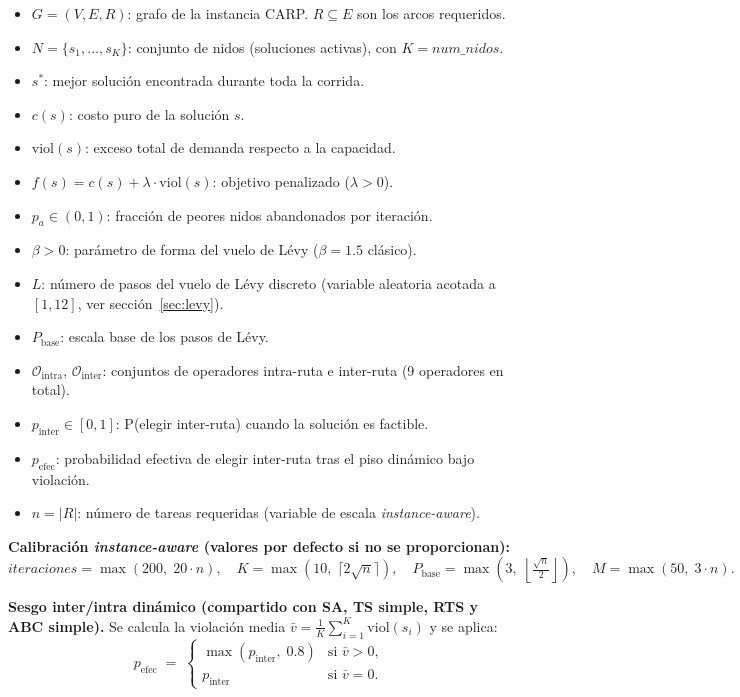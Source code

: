 \documentclass[12pt, a4paper]{article}
\begin{document}
\begin{itemize}
    \item $G = (V, E, R)$: grafo de la instancia CARP. $R \subseteq E$ son los
          arcos requeridos.
    \item $N = \{s_1, \ldots, s_{K}\}$: conjunto de nidos (soluciones activas),
          con $K = \mathit{num\_nidos}$.
    \item $s^{*}$: mejor solución encontrada durante toda la corrida.
    \item $c(s)$: costo puro de la solución $s$.
    \item $\mathrm{viol}(s)$: exceso total de demanda respecto a la capacidad.
    \item $f(s) = c(s) + \lambda \cdot \mathrm{viol}(s)$: objetivo penalizado
          ($\lambda > 0$).
    \item $p_a \in (0,1)$: fracción de peores nidos abandonados por iteración.
    \item $\beta > 0$: parámetro de forma del vuelo de Lévy ($\beta = 1.5$
          clásico).
    \item $L$: número de pasos del vuelo de Lévy discreto (variable aleatoria
          acotada a $[1, 12]$, ver sección~\ref{sec:levy}).
    \item $P_{\mathrm{base}}$: escala base de los pasos de Lévy.
    \item $\mathcal{O}_{\mathrm{intra}}$, $\mathcal{O}_{\mathrm{inter}}$:
          conjuntos de operadores intra-ruta e inter-ruta (9 operadores en total).
    \item $p_{\mathrm{inter}} \in [0,1]$: P(elegir inter-ruta) cuando la solución
          es factible.
    \item $p_{\mathrm{efec}}$: probabilidad efectiva de elegir inter-ruta tras el
          piso dinámico bajo violación.
    \item $n = |R|$: número de tareas requeridas (variable de escala
          \emph{instance-aware}).
\end{itemize}

\medskip
\noindent
\textbf{Calibración \emph{instance-aware} (valores por defecto si no se
proporcionan):}
\[
\mathit{iteraciones} = \max(200,\; 20 \cdot n), \quad
K = \max(10,\; \lceil 2\sqrt{n} \rceil), \quad
P_{\mathrm{base}} = \max\!\left(3,\; \left\lfloor\tfrac{\sqrt{n}}{2}\right\rfloor\right), \quad
M = \max(50,\; 3 \cdot n).
\]

\medskip
\noindent
\textbf{Sesgo inter/intra dinámico (compartido con SA, TS simple, RTS y ABC simple).}
Se calcula la violación media $\bar{v} = \tfrac{1}{K}\sum_{i=1}^{K}\mathrm{viol}(s_i)$
y se aplica:
\[
p_{\mathrm{efec}} \;=\;
\begin{cases}
  \max(p_{\mathrm{inter}},\; 0.8) & \text{si } \bar{v} > 0, \\
  p_{\mathrm{inter}}              & \text{si } \bar{v} = 0.
\end{cases}
\]
\end{document}
